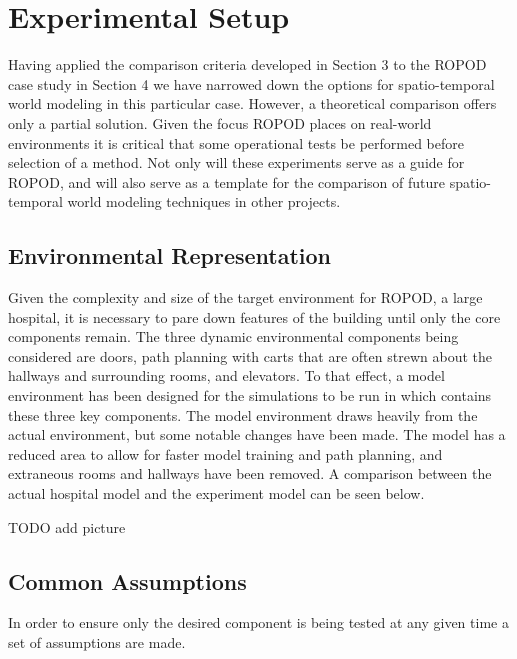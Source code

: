 

  \chapter{Experimental Setup}

  Having applied the comparison criteria developed in Section 3 to the ROPOD case
  study in Section 4 we have narrowed down the options for spatio-temporal
  world modeling in this particular case. However, a theoretical comparison offers
  only a partial solution. Given the focus ROPOD places on real-world
  environments it is critical that some operational tests be performed before
  selection of a method. Not only will these experiments serve as a guide for ROPOD,
  and will also serve as a template for the comparison of future
  spatio-temporal world modeling techniques in other projects. \\

  \section{ Environmental Representation}

  Given the complexity and size of the target environment for ROPOD, a large
  hospital, it is necessary to pare down features of the building until only
  the core components remain. The three dynamic environmental components being
  considered are doors, path planning with carts that are often strewn about the
  hallways and surrounding rooms, and elevators. To that effect, a model
  environment has been designed for the simulations to be run in which contains
  these three key components. The model environment
  draws heavily from the actual environment, but some notable changes have been
  made. The model has a reduced area to allow for faster model training and
  path planning, and extraneous rooms and hallways have been
  removed. A comparison between the actual hospital model and the experiment model can
  be seen below.

  TODO add picture


  \section{ Common Assumptions }
  In order to ensure only the desired component is being tested at any given
  time a set of assumptions are made.

